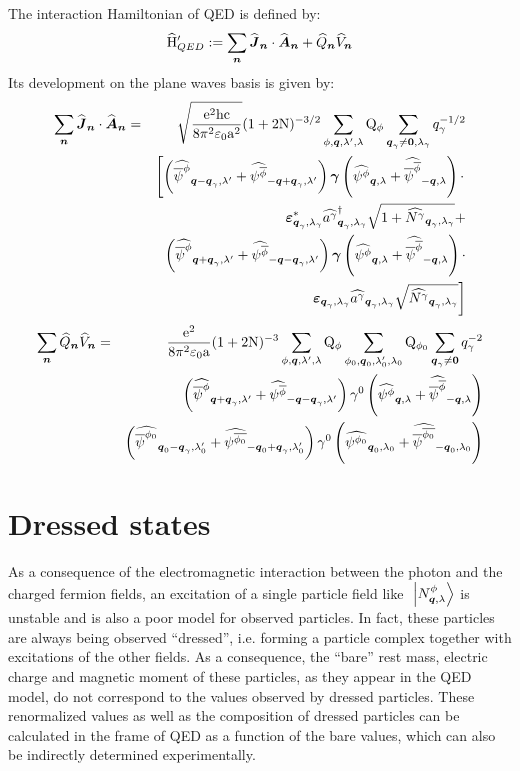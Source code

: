 The interaction Hamiltonian of QED is defined by:
\begin{equation*}
\HopQED \eqdef \sum_{\n} \Jop \n \ssp \Aop \n + \Qop \n \Vop \n
\end{equation*}
Its development on the plane waves basis is given by:
\begin{eqnarray*}
\sum_{\n} \Jop \n \ssp \Aop \n & = & \sqrt{\frac{\e^2 \h \c}{8 \pi^2 \vpty \a^2}} ( 1 + 2 \N )^{-3/2} \sum_{\pt, \q, \sp', \sp} \Qp \pt \sum_{\q_\photon \neq \sv 0, \sp_\photon} q_\photon^{-1/2} \\
&& \left[ \left( \SCop \pt {\q - \q_\photon} {\sp'} + \SAop {\antiparticle \pt} {-\q + \q_\photon} {\sp'} \right) \gamvec \left( \SAop \pt \q \sp + \SCop {\antiparticle \pt} {-\q} \sp \right) \ssp \right. \\
&& \cphotonspin {\q_\photon} {\sp_\photon} \cop \photon {\q_\photon} {\sp_\photon} \sqrt{1 + \Nop \photon {\q_\photon} {\sp_\photon}} + \\
&& \left( \SCop \pt {\q + \q_\photon} {\sp'} + \SAop {\antiparticle \pt} {-\q - \q_\photon} {\sp'} \right) \gamvec \left( \SAop \pt \q \sp + \SCop {\antiparticle \pt} {-\q} \sp \right) \ssp \\
&& \left. \photonspin {\q_\photon} {\sp_\photon} \aop \photon {\q_\photon} {\sp_\photon} \sqrt{\Nop \photon {\q_\photon} {\sp_\photon}} \right]
\end{eqnarray*}
\begin{eqnarray*}
\sum_{\n} \Qop \n \Vop \n & = & \frac{\e^2}{8 \pi^2 \vpty \a} ( 1 + 2 \N )^{-3} \sum_{\pt,\q,\sp',\sp} \Qp \pt \sum_{\pt_0,\q_0,\sp'_0,\sp_0} \Qp {\pt_0} \sum_{\q_\photon \neq \sv 0} q_\photon^{-2} \\
&& \left( \SCop \pt {\q + \q_\photon} {\sp'} + \SAop {\antiparticle \pt} {-\q - \q_\photon} {\sp'} \right) \gammat 0 \left( \SAop \pt \q \sp + \SCop {\antiparticle \pt} {-\q} \sp \right) \\
&& \left( \SCop {\pt_0} {\q_0 - \q_\photon} {\sp'_0} + \SAop {\antiparticle {\pt_0}} {-\q_0 + \q_\photon} {\sp'_0} \right) \gammat 0 \left( \SAop {\pt_0} {\q_0} {\sp_0} + \SCop {\antiparticle {\pt_0}} {-\q_0} {\sp_0} \right)
\end{eqnarray*}

\section{Dressed states}

As a consequence of the electromagnetic interaction between the photon and the charged fermion fields, an excitation of a single particle field like $\ketQ N \pt \q \sp$ is unstable and is also a poor model for observed particles. In fact, these particles are always being observed ``dressed'', i.e. forming a particle complex together with excitations of the other fields. As a consequence, the ``bare'' rest mass, electric charge and magnetic moment of these particles, as they appear in the QED model, do not correspond to the values observed by dressed particles. These renormalized values as well as the composition of dressed particles can be calculated in the frame of QED as a function of the bare values, which can also be indirectly determined experimentally.

